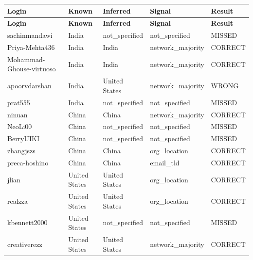 \documentclass[11pt,a4paper]{article}
\begin{document}
\renewcommand{\arraystretch}{1.15}
\begin{longtable}{>{\ttfamily\small}p{4.4cm} p{3.0cm} p{3.0cm} p{2.6cm} p{1.6cm}}
\toprule
\textbf{Login} & \textbf{Known} & \textbf{Inferred} & \textbf{Signal} & \textbf{Result} \\
\midrule
\endfirsthead
\toprule
\textbf{Login} & \textbf{Known} & \textbf{Inferred} & \textbf{Signal} & \textbf{Result} \\
\midrule
\endhead
\bottomrule
\endfoot

\rowcolor{missed}   sachinmandawi             & India          & not\_specified  & not\_specified   & MISSED  \\
\rowcolor{correct}  Priya-Mehta436            & India          & India           & network\_majority & CORRECT \\
\rowcolor{correct}  Mohammad-Ghouse-virtuoso  & India          & India           & network\_majority & CORRECT \\
\rowcolor{wrong}    apoorvdarshan             & India          & United States   & network\_majority & WRONG   \\
\rowcolor{missed}   prat555                   & India          & not\_specified  & not\_specified   & MISSED  \\
\rowcolor{correct}  ninuan                    & China          & China           & network\_majority & CORRECT \\
\rowcolor{missed}   NeoLi00                   & China          & not\_specified  & not\_specified   & MISSED  \\
\rowcolor{missed}   BerryUIKI                 & China          & not\_specified  & not\_specified   & MISSED  \\
\rowcolor{correct}  zhangjszs                 & China          & China           & org\_location    & CORRECT \\
\rowcolor{correct}  preca-hoshino             & China          & China           & email\_tld       & CORRECT \\
\rowcolor{correct}  jlian                     & United States  & United States   & org\_location    & CORRECT \\
\rowcolor{correct}  realzza                   & United States  & United States   & org\_location    & CORRECT \\
\rowcolor{missed}   kbennett2000              & United States  & not\_specified  & not\_specified   & MISSED  \\
\rowcolor{correct}  creativerezz              & United States  & United States   & network\_majority & CORRECT \\

\end{longtable}
\end{document}
